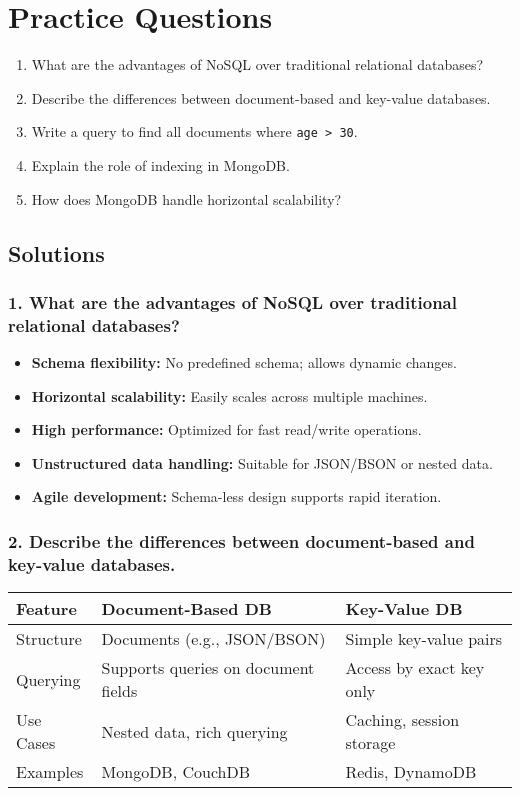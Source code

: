 \documentclass{article}
\begin{document}
\section{Practice Questions}
\begin{enumerate}
    \item What are the advantages of NoSQL over traditional relational databases?
    \item Describe the differences between document-based and key-value databases.
    \item Write a query to find all documents where \texttt{age > 30}.
    \item Explain the role of indexing in MongoDB.
    \item How does MongoDB handle horizontal scalability?
\end{enumerate}

\subsection*{Solutions}

\subsubsection*{1. What are the advantages of NoSQL over traditional relational databases?}

\begin{itemize}
    \item \textbf{Schema flexibility:} No predefined schema; allows dynamic changes.
    \item \textbf{Horizontal scalability:} Easily scales across multiple machines.
    \item \textbf{High performance:} Optimized for fast read/write operations.
    \item \textbf{Unstructured data handling:} Suitable for JSON/BSON or nested data.
    \item \textbf{Agile development:} Schema-less design supports rapid iteration.
\end{itemize}

\subsubsection*{2. Describe the differences between document-based and key-value databases.}

\begin{center}
\begin{tabular}{@{}lll@{}}
\toprule
\textbf{Feature} & \textbf{Document-Based DB} & \textbf{Key-Value DB} \\
\midrule
Structure & Documents (e.g., JSON/BSON) & Simple key-value pairs \\
Querying & Supports queries on document fields & Access by exact key only \\
Use Cases & Nested data, rich querying & Caching, session storage \\
Examples & MongoDB, CouchDB & Redis, DynamoDB \\
\bottomrule
\end{tabular}
\end{center}
\end{document}
